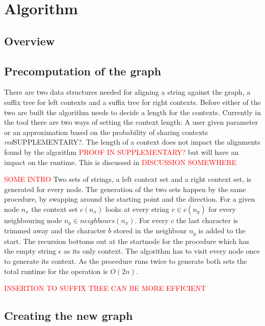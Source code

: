 \documentclass[thesis.tex]{subfiles}
\begin{document}
\section{Algorithm}
\subsection{Overview}
\subsection{Precomputation of the graph}
There are two data structures needed for aligning a string against the graph, a suffix tree for left contexts and a suffix tree for right contexts. Before either of the two are built the algorithm needs to decide a length for the contexts. Currently in the tool there are two ways of setting the context length: A user given parameter or an approximation based on the probability of sharing contexts \textit{red}{SUPPLEMENTARY?}. The length of a context does not impact the alignments found by the algorithm \textcolor{red}{PROOF IN SUPPLEMENTARY?} but will have an impact on the runtime. This is discussed in \textcolor{red}{DISCUSSION SOMEWHERE}\\
\par\noindent
\textcolor{red}{SOME INTRO} Two sets of strings, a left context set and a right context set, is generated for every node. The generation of the two sets happen by the same procedure, by swapping around the starting point and the direction. For a given node $n_x$ the context set $c(n_x)$ looks at every string $c \in c(n_y)$ for every neighbouring node $n_y \in neighbours(n_x)$. For every $c$ the last character is trimmed away and the character $b$ stored in the neighbour $n_y$ is added to the start. The recursion bottoms out at the startnode for the procedure which has the empty string $\epsilon$ as its only context. The algorithm has to visit every node once to generate its context. As the procedure runs twice to generate both sets the total runtime for the operation is $O(2n)$.\\
\par\noindent
\textcolor{red}{INSERTION TO SUFFIX TREE CAN BE MORE EFFICIENT}
\subsection{Creating the new graph}
\end{document}
